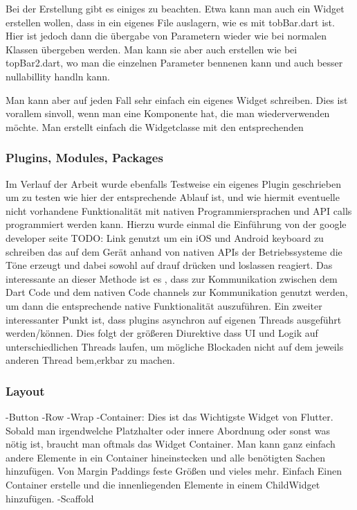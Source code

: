 Bei der Erstellung gibt es einiges zu beachten. 
Etwa kann man auch ein Widget erstellen wollen, dass in ein eigenes File auslagern, wie es mit tobBar.dart ist. Hier ist jedoch dann die übergabe von Parametern wieder wie bei normalen Klassen übergeben werden. Man kann sie aber auch erstellen wie bei topBar2.dart, wo man die einzelnen Parameter bennenen kann und auch besser nullabillity handln kann.

Man kann aber auf jeden Fall sehr einfach ein eigenes Widget schreiben. Dies ist vorallem sinvoll, wenn man eine Komponente hat, die man wiederverwenden möchte. Man erstellt einfach die Widgetclasse mit den entsprechenden 
\subsubsection{Plugins, Modules, Packages}
Im Verlauf der Arbeit wurde ebenfalls Testweise ein eigenes Plugin geschrieben um zu testen wie hier der entsprechende Ablauf ist, und wie hiermit eventuelle nicht vorhandene Funktionalität mit nativen Programmiersprachen und API calls programmiert werden kann. Hierzu wurde einmal die Einführung von der google developer seite TODO: Link genutzt um ein iOS und Android keyboard zu schreiben das auf dem Gerät anhand von nativen APIs der Betriebssysteme die Töne erzeugt und dabei sowohl auf drauf drücken und loslassen reagiert.
Das interessante an dieser Methode ist es , dass zur Kommunikation zwischen dem Dart Code und dem nativen Code channels zur Kommunikation genutzt werden, um dann die entsprechende native Funktionalität auszuführen. Ein zweiter interessanter Punkt ist, dass plugins asynchron auf eigenen Threads ausgeführt werden/können. Dies folgt der größeren Diurektive dass UI und Logik auf unterschiedlichen Threads laufen, um mögliche Blockaden nicht auf dem jeweils anderen Thread bem,erkbar zu machen.



\subsubsection{Layout}
-Button
-Row
-Wrap
-Container: Dies ist das Wichtigste Widget von Flutter. Sobald man irgendwelche Platzhalter oder innere Abordnung oder sonst was nötig ist, braucht man oftmals das Widget Container. Man kann ganz einfach andere Elemente in ein Container hineinstecken und alle benötigten Sachen hinzufügen. Von Margin Paddings feste Größen und vieles mehr. Einfach Einen Container erstelle und die innenliegenden Elemente in einem ChildWidget hinzufügen.
-Scaffold
